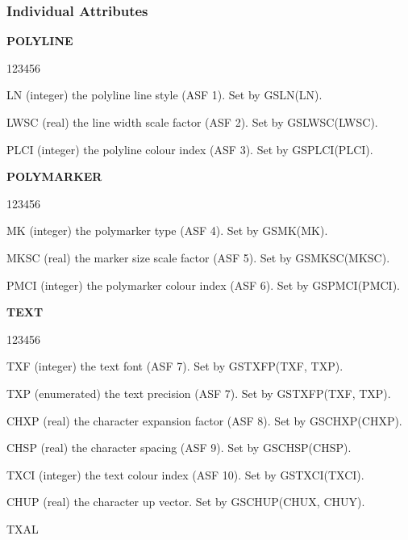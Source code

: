 \subsubsection{Individual Attributes}
\begin{UL}
\item {\bf POLYLINE}
\begin{DLtt}{123456}
\item[LN]
(integer) the polyline line style (ASF 1). Set by GSLN(LN).
\item[LWSC]
(real) the line width scale factor (ASF 2). Set by GSLWSC(LWSC).
\item[PLCI]
(integer) the polyline colour index (ASF 3). Set by GSPLCI(PLCI).
\end{DLtt}
\item {\bf POLYMARKER}
\begin{DLtt}{123456}
\item[MK]
(integer) the polymarker type (ASF 4). Set by GSMK(MK).
\item[MKSC]
(real) the marker size scale factor (ASF 5). Set by GSMKSC(MKSC).
\item[PMCI]
(integer) the polymarker colour index (ASF 6). Set by GSPMCI(PMCI).
\end{DLtt}
\item {\bf TEXT}
\begin{DLtt}{123456}
\item[TXF]
(integer) the text font (ASF 7). Set by GSTXFP(TXF, TXP).
\item[TXP]
(enumerated) the text precision (ASF 7). Set by GSTXFP(TXF, TXP).
\item[CHXP]
(real) the character expansion factor (ASF 8). Set by GSCHXP(CHXP).
\item[CHSP]
(real) the character spacing (ASF 9). Set by GSCHSP(CHSP).
\item[TXCI]
(integer) the text colour index (ASF 10). Set by GSTXCI(TXCI).
\item[CHUP]
(real) the character up vector. Set by GSCHUP(CHUX, CHUY).
\item[TXAL]

\end{DLtt}
\end{UL}
